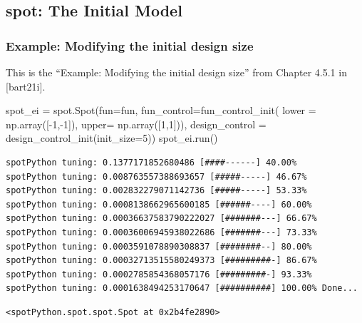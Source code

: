 \documentclass[
  letterpaper,
  DIV=11,
  numbers=noendperiod]{scrreprt}
\newenvironment{Shaded}{\begin{snugshade}}{\end{snugshade}}
\newcommand{\DecValTok}[1]{\textcolor[rgb]{0.68,0.00,0.00}{#1}}
\newcommand{\NormalTok}[1]{\textcolor[rgb]{0.00,0.23,0.31}{#1}}
\newcommand{\OperatorTok}[1]{\textcolor[rgb]{0.37,0.37,0.37}{#1}}
\begin{document}
\subsection{spot: The Initial Model}\label{spot-the-initial-model}

\subsubsection{Example: Modifying the initial design
size}\label{example-modifying-the-initial-design-size}

This is the ``Example: Modifying the initial design size'' from Chapter
4.5.1 in {[}bart21i{]}.

\begin{Shaded}
\begin{Highlighting}[]
\NormalTok{spot\_ei }\OperatorTok{=}\NormalTok{ spot.Spot(fun}\OperatorTok{=}\NormalTok{fun,}
\NormalTok{                fun\_control}\OperatorTok{=}\NormalTok{fun\_control\_init(}
\NormalTok{                lower }\OperatorTok{=}\NormalTok{ np.array([}\OperatorTok{{-}}\DecValTok{1}\NormalTok{,}\OperatorTok{{-}}\DecValTok{1}\NormalTok{]),}
\NormalTok{                upper}\OperatorTok{=}\NormalTok{ np.array([}\DecValTok{1}\NormalTok{,}\DecValTok{1}\NormalTok{])), }
\NormalTok{                design\_control }\OperatorTok{=}\NormalTok{ design\_control\_init(init\_size}\OperatorTok{=}\DecValTok{5}\NormalTok{))}
\NormalTok{spot\_ei.run()}
\end{Highlighting}
\end{Shaded}

\begin{verbatim}
spotPython tuning: 0.1377171852680486 [####------] 40.00% 
spotPython tuning: 0.008763557388693657 [#####-----] 46.67% 
spotPython tuning: 0.002832279071142736 [#####-----] 53.33% 
spotPython tuning: 0.0008138662965600185 [######----] 60.00% 
spotPython tuning: 0.00036637583790222027 [#######---] 66.67% 
spotPython tuning: 0.00036006945938022686 [#######---] 73.33% 
spotPython tuning: 0.0003591078890308837 [########--] 80.00% 
spotPython tuning: 0.00032713515580249373 [#########-] 86.67% 
spotPython tuning: 0.0002785854368057176 [#########-] 93.33% 
spotPython tuning: 0.0001638494253170647 [##########] 100.00% Done...
\end{verbatim}

\begin{verbatim}
<spotPython.spot.spot.Spot at 0x2b4fe2890>
\end{verbatim}
\end{document}
